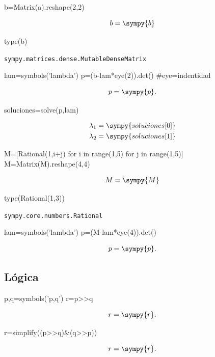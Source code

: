 \begin{sympyblock}
b=Matrix(a).reshape(2,2)
\end{sympyblock}

\[
 b=\sympy{b}
\]

\begin{sympyblock}
type(b) 
\end{sympyblock}

\texttt{sympy.matrices.dense.MutableDenseMatrix}

\begin{sympyblock}
lam=symbols('lambda')
p=(b-lam*eye(2)).det() #eye=indentidad
\end{sympyblock}
\[
 p=\sympy{p}.
\]




\begin{sympyblock}
soluciones=solve(p,lam) 
\end{sympyblock}
\[
\begin{split}
  \lambda_1&=\sympy{soluciones[0]}\\
  \lambda_2&=\sympy{soluciones[1]}
\end{split}
\]

\begin{sympyblock}
M=[Rational(1,i+j) for i in range(1,5) for j in range(1,5)]
M=Matrix(M).reshape(4,4)
\end{sympyblock}

\[
 M=\sympy{M}
\]


\begin{sympyblock}
type(Rational(1,3)) 
\end{sympyblock}

\texttt{sympy.core.numbers.Rational}

\begin{sympyblock}
lam=symbols('lambda')
p=(M-lam*eye(4)).det()
\end{sympyblock}

\[
p=\sympy{p}.
\]


\subsection{Lógica}

\begin{sympyblock}
p,q=symbols('p,q')
r=p>>q
\end{sympyblock}

$$r=\sympy{r}.$$

\begin{sympyblock}
r=simplify((p>>q)&(q>>p))
\end{sympyblock}
$$r=\sympy{r}.$$


